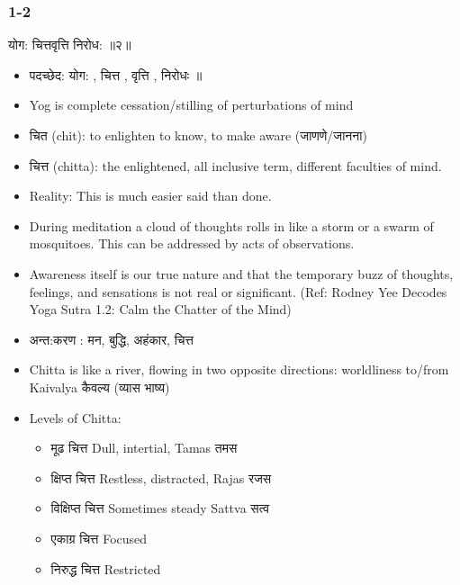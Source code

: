 \begin{frame}[fragile]\frametitle{1-2}

\begin{sanskrit}
योग: चित्तवृत्ति निरोध:  ॥२॥
\end{sanskrit}

\begin{itemize}
\item पदच्छेद: योग: , चित्त , वृत्ति , निरोधः ॥
\item Yog is complete cessation/stilling of perturbations of mind
\item चित (chit): to enlighten to know, to make aware (जाणणे/जानना)
\item चित्त (chitta): the enlightened, all inclusive term, different faculties of mind.
\item Reality: This is much easier said than done. 
\item During meditation a cloud of thoughts rolls in like a storm or a swarm of mosquitoes. This can be addressed by acts of observations. \item Awareness itself is our true nature and that the temporary buzz of thoughts, feelings, and sensations is not real or significant. ({\tiny Ref: Rodney Yee Decodes Yoga Sutra 1.2: Calm the Chatter of the Mind})
\item अन्त:करण : मन, बुद्धि, अहंकार, चित्त
\item Chitta is like a river, flowing in two opposite directions: worldliness to/from Kaivalya कैवल्य (व्यास भाष्य)
\item Levels of Chitta:
	\begin{itemize}
	\item मूढ चित्त  Dull, intertial, Tamas तमस
	\item क्षिप्त चित्त  Restless, distracted, Rajas  रजस
	\item विक्षिप्त चित्त Sometimes steady Sattva सत्व
	\item एकाग्र चित्त Focused
	\item निरुद्ध चित्त Restricted
	\end{itemize}	
\end{itemize}

\end{frame}


